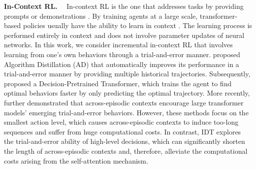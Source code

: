 \noindent\textbf{In-Context RL.}~~
In-context RL is the one that addresses tasks by providing prompts or demonstrations \cite{2,43}. By training agents at a large scale, transformer-based policies usually have the ability to learn in context \cite{14,27}. The learning process is performed entirely in context and does not involve parameter updates of neural networks. In this work, we consider incremental in-context RL that involves learning from one's own behaviors through a trial-and-error manner. \citet{8} proposed Algorithm Distillation (AD) that automatically improves its performance in a trial-and-error manner by providing multiple historical trajectories. Subsequently, \citet{44} proposed a Decision-Pretrained Transformer, which trains the agent to find optimal behaviors faster by only predicting the optimal trajectory. More recently, \citet{1} further demonstrated that across-episodic contexts encourage large transformer models' emerging trial-and-error behaviors. However, these methods focus on the smallest action level, which causes across-episodic contexts to induce too-long sequences and suffer from huge computational costs. In contrast, IDT explores the trial-and-error ability of high-level decisions, which can significantly shorten the length of across-episodic contexts and, therefore, alleviate the computational costs arising from the self-attention mechanism.
